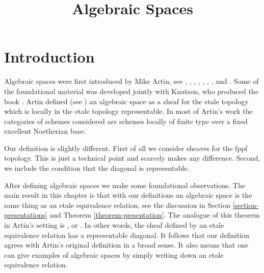 

%


\title{Algebraic Spaces}


\maketitle

\label{section-phantom}

\tableofcontents

\section{Introduction}
\label{section-introduction}

\noindent
Algebraic spaces were first introduced by Mike Artin,
see \cite{ArtinI}, \cite{ArtinII},
\cite{Artin-Theorem-Representability},
\cite{Artin-Construction-Techniques},
\cite{Artin-Algebraic-Spaces},
\cite{Artin-Algebraic-Approximation},
\cite{Artin-Implicit-Function},
and \cite{ArtinVersal}.
Some of the foundational material was developed jointly with
Knutson, who produced the book \cite{Kn}.
Artin defined (see \cite[Definition 1.3]{Artin-Implicit-Function})
an algebraic space as a sheaf for the etale topology
which is locally in the etale topology representable.
In most of Artin's work the categories of schemes
considered are schemes locally of finite type over a fixed
excellent Noetherian base.

\medskip\noindent
Our definition is slightly different. First of all we consider sheaves
for the fppf topology. This is just a technical point and scarcely makes
any difference. Second, we include the condition that the diagonal is
representable.

\medskip\noindent
After defining algebraic spaces we make some foundational observations.
The main result in this chapter is that with our definitions
an algebraic space is the same thing as an etale equivalence relation,
see the discussion in Section \ref{section-presentations} and
Theorem \ref{theorem-presentation}. The analogue of this theorem in
Artin's setting is \cite[Theorem 1.5]{Artin-Implicit-Function}, or
\cite[Proposition II.1.7]{Kn}. In other words, the sheaf
defined by an etale equivalence relation has a representable diagonal.
It follows that our definition agrees with Artin's original definition
in a broad sense. It also means that one can give examples of algebraic
spaces by simply writing down an etale equivalence relation.

